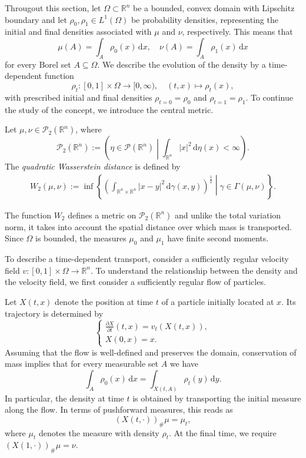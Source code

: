 Througout this section, let $\Omega\subset \mathbb{R}^n$ be a bounded, convex domain with Lipschitz boundary and let $\rho_0,\rho_1\in L^1(\Omega)$ be probability densities, representing the initial and final densities associated with $\mu$ and $\nu$, respectively. This means that
$$
\mu(A) = \int_A\rho_0(x)\,\mathrm{d}x,\quad\nu(A)=\int_A\rho_1(x)\,\mathrm{d}x
$$
for every Borel set $A\subseteq \Omega$. We describe the evolution of the density by a time-dependent function
$$
\rho_t:[0,1]\times \Omega\to[0,\infty),\quad (t,x)\mapsto\rho_t(x),
$$
with prescribed initial and final densities $\rho_{t=0}=\rho_0$ and $\rho_{t=1} = \rho_1$. To continue the study of the concept, we introduce the central metric.
\begin{definition}
	Let $\mu,\nu\in\mathscr{P}_2(\mathbb{R}^n)$, where
	$$
	\mathscr{P}_2(\mathbb{R}^n) := \left(\eta\in \mathscr{P}(\mathbb{R}^n) \middle|\int_{\mathbb{R}^n} |x|^2\,\mathrm{d}\eta(x) < \infty\right).
	$$
	The \emph{quadratic Wasserstein distance} is defined by
	\begin{align*}
		W_2(\mu,\nu) := \inf\left\{\left(\int_{\mathbb{R}^n\times \mathbb{R}^n} |x-y|^2\,\mathrm{d}\gamma(x,y)\right)^{\frac{1}{2}}\middle|\gamma\in\Gamma(\mu,\nu)\right\}.
	\end{align*}
\end{definition}
The function $W_2$ defines a metric on $\mathscr{P}_2(\mathbb{R}^n)$ and unlike the total variation norm, it takes into account the spatial distance over which mass is transported. Since $\Omega$ is bounded, the measures $\mu_0$ and $\mu_1$ have finite second moments.

To describe a time-dependent transport, consider a sufficiently regular velocity field $v:[0,1]\times \Omega\to \mathbb{R}^n$. To understand the relationship between the density and the velocity field, we first consider a sufficiently regular flow of particles.

Let $X(t,x)$ denote the position at time $t$ of a particle initially located at $x$. Its trajectory is determined by 
\begin{equation*}
	\begin{cases}\frac{\partial X}{\partial t}(t,x) = v_t(X(t,x)),\\
	X(0,x) = x. \end{cases} \label{eq:particle_flow}
\end{equation*}
Assuming that the flow is well-defined and preserves the domain, conservation of mass implies that for every measurable set $A$ we have
$$
\int_A\rho_0(x)\,\mathrm{d}x = \int_{X(t,A)}\rho_t(y)\,\mathrm{d}y.
$$
In particular, the density at time $t$ is obtained by transporting the initial measure along the flow. In terms of pushforward measures, this reads as 
$$
(X(t,\cdot))_\#\mu = \mu_t,
$$
where $\mu_t$ denotes the measure with density $\rho_t$. At the final time, we require $(X(1,\cdot))_\#\mu = \nu.$


